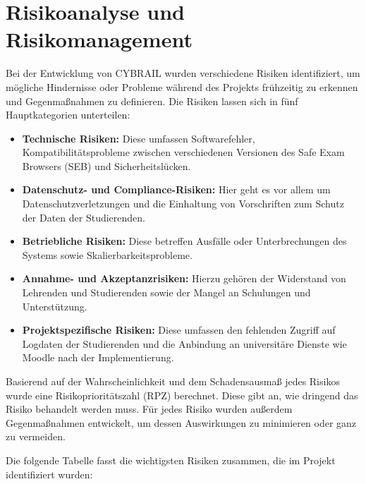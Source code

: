 \chapter{Risikoanalyse und Risikomanagement} \label{ch:Risikoanalyse}
Bei der Entwicklung von CYBRAIL wurden verschiedene Risiken identifiziert, um mögliche Hindernisse oder Probleme während des Projekts frühzeitig zu erkennen und Gegenmaßnahmen zu definieren. 
Die Risiken lassen sich in fünf Hauptkategorien unterteilen:

\begin{itemize} \item \textbf{Technische Risiken:} Diese umfassen Softwarefehler, Kompatibilitätsprobleme zwischen verschiedenen Versionen des Safe Exam Browsers (SEB) und Sicherheitslücken. 
\item \textbf{Datenschutz- und Compliance-Risiken:} Hier geht es vor allem um Datenschutzverletzungen und die Einhaltung von Vorschriften zum Schutz der Daten der Studierenden. 
\item \textbf{Betriebliche Risiken:} Diese betreffen Ausfälle oder Unterbrechungen des Systems sowie Skalierbarkeitsprobleme. 
\item \textbf{Annahme- und Akzeptanzrisiken:} Hierzu gehören der Widerstand von Lehrenden und Studierenden sowie der Mangel an Schulungen und Unterstützung. 
\item \textbf{Projektspezifische Risiken:} Diese umfassen den fehlenden Zugriff auf Logdaten der Studierenden und die Anbindung an universitäre Dienste wie Moodle nach der Implementierung. \end{itemize}

Basierend auf der Wahrscheinlichkeit und dem Schadensausmaß jedes Risikos wurde eine Risikoprioritätszahl (RPZ) berechnet. 
Diese gibt an, wie dringend das Risiko behandelt werden muss. Für jedes Risiko wurden außerdem Gegenmaßnahmen entwickelt, um dessen Auswirkungen zu minimieren oder ganz zu vermeiden.

Die folgende Tabelle fasst die wichtigsten Risiken zusammen, die im Projekt identifiziert wurden:


